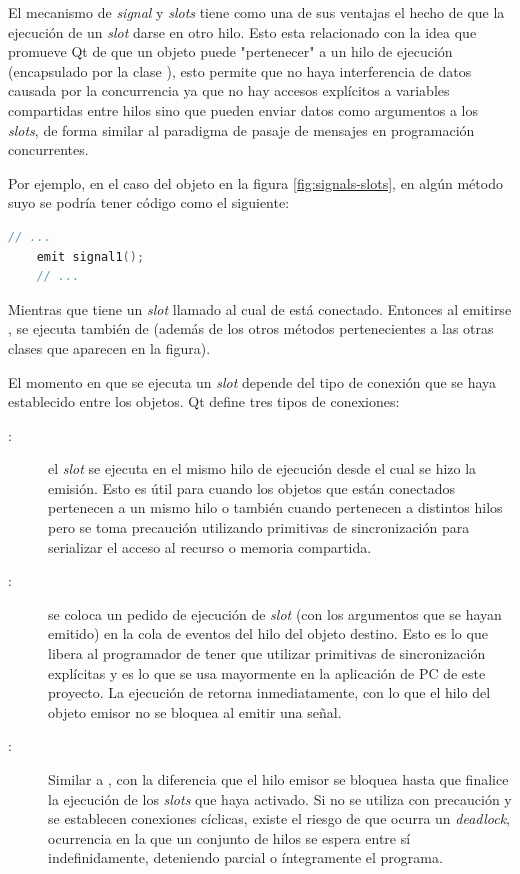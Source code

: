 El mecanismo de \emph{signal} y \emph{slots} tiene como una de sus ventajas el hecho de que la ejecución de un \emph{slot} darse en otro hilo. Esto esta relacionado con la idea que promueve Qt de que un objeto puede "pertenecer" a un hilo de ejecución (encapsulado por la clase ), esto permite que no haya interferencia de datos causada por la concurrencia ya que no hay accesos explícitos a variables compartidas entre hilos sino que pueden enviar datos como argumentos a los \emph{slots}, de forma similar al paradigma de pasaje de mensajes en programación concurrentes.

Por ejemplo, en el caso del objeto  en la figura \ref{fig:signals-slots}, en algún método suyo se podría tener código como el siguiente:
\begin{lstlisting}[language=c++]
	// ...
	emit signal1();
	// ...
\end{lstlisting}

Mientras que  tiene un \emph{slot} llamado  al cual  de  está conectado. Entonces al emitirse , se ejecuta también  de  (además de los otros métodos pertenecientes a las otras clases que aparecen en la figura).

El momento en que se ejecuta un \emph{slot} depende del tipo de conexión que se haya establecido entre los objetos. Qt define tres tipos de conexiones:
\begin{description}
	\item[:] el \emph{slot} se ejecuta en el mismo hilo de ejecución desde el cual se hizo la emisión. Esto es útil para cuando los objetos que están conectados pertenecen a un mismo hilo o también cuando pertenecen a distintos hilos pero se toma precaución utilizando primitivas de sincronización para serializar el acceso al recurso o memoria compartida.
	\item[:] se coloca un pedido de ejecución de \emph{slot} (con los argumentos que se hayan emitido) en la cola de eventos del hilo del objeto destino. Esto es lo que libera al programador de tener que utilizar primitivas de sincronización explícitas y es lo que se usa mayormente en la aplicación de PC de este proyecto. La ejecución de  retorna inmediatamente, con lo que el hilo del objeto emisor no se bloquea al emitir una señal.
	\item[:] Similar a , con la diferencia que el hilo emisor se bloquea hasta que finalice la ejecución de los \emph{slots} que haya activado. Si no se utiliza con precaución y se establecen conexiones cíclicas, existe el riesgo de que ocurra un \emph{deadlock}, ocurrencia en la que un conjunto de hilos se espera entre sí indefinidamente, deteniendo parcial o íntegramente el programa.
\end{description}

